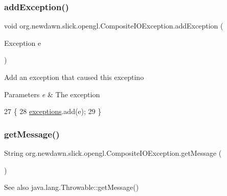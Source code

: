 \subsubsection{\texorpdfstring{add\+Exception()}{addException()}}
{\footnotesize\ttfamily void org.\+newdawn.\+slick.\+opengl.\+Composite\+I\+O\+Exception.\+add\+Exception (\begin{DoxyParamCaption}\item[{Exception}]{e }\end{DoxyParamCaption})\hspace{0.3cm}{\ttfamily [inline]}}

Add an exception that caused this exceptino


\begin{DoxyParams}{Parameters}
{\em e} & The exception \\
\hline
\end{DoxyParams}

\begin{DoxyCode}
27                                           \{
28         \mbox{\hyperlink{classorg_1_1newdawn_1_1slick_1_1opengl_1_1_composite_i_o_exception_af43e5dc3fe90a30ae72aab39b866349a}{exceptions}}.add(e);
29     \}
\end{DoxyCode}
\mbox{\label{classorg_1_1newdawn_1_1slick_1_1opengl_1_1_composite_i_o_exception_a2e50a6e1acf81ff82b05214c2c04b1f8}} 
\subsubsection{\texorpdfstring{get\+Message()}{getMessage()}}
{\footnotesize\ttfamily String org.\+newdawn.\+slick.\+opengl.\+Composite\+I\+O\+Exception.\+get\+Message (\begin{DoxyParamCaption}{ }\end{DoxyParamCaption})\hspace{0.3cm}{\ttfamily [inline]}}

\begin{DoxySeeAlso}{See also}
java.\+lang.\+Throwable\+::get\+Message() 
\end{DoxySeeAlso}

